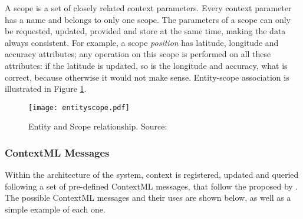 A scope is a set of closely related context parameters. Every context parameter has a name and belongs to only one scope. The parameters of a scope can only be requested, updated, provided and store at the same time, making the data always consistent. For example, a scope \textit{position} has latitude, longitude and accuracy attributes; any operation on this scope is performed on all these attributes: if the latitude is updated, so is the longitude and accuracy, what is correct, because otherwise it would not make sense. Entity-scope association is illustrated in Figure \ref{fig:entityscope}. \par

\begin{figure}[H]
	\centering
	\texttt{[image: entityscope.pdf]}
	\caption{Entity and Scope relationship. Source: \cite{knappmeyer2010contextml}}
	\label{fig:entityscope}
	
\end{figure}

\subsubsection{ContextML Messages}
Within the architecture of the system, context is registered, updated and queried following a set of pre-defined ContextML messages, that follow the proposed by \cite{knappmeyer2010contextml}. The possible ContextML messages and their uses are shown below, as well as a simple example of each one.

